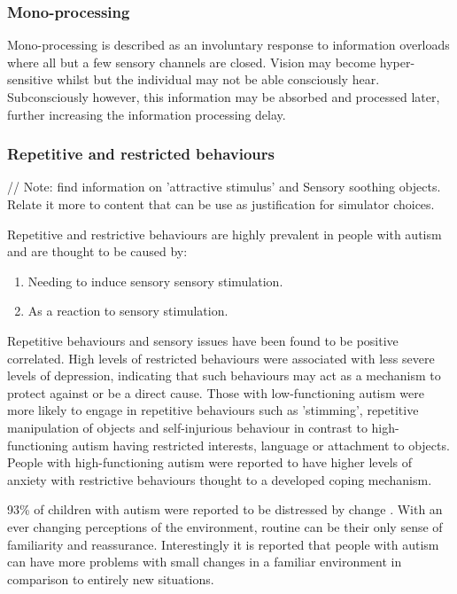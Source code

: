\documentclass[11pt]{report}
\begin{document}
\subsubsection{Mono-processing}
Mono-processing is described as an involuntary response to information overloads where all but a few sensory channels are closed. Vision may become hyper-sensitive whilst but the individual may not be able consciously hear. Subconsciously however, this information may be absorbed and processed later, further increasing the information processing delay. 


\subsubsection{Repetitive and restricted behaviours}

// Note: find information on 'attractive stimulus' and Sensory soothing objects. Relate it more to content that can be use as justification for simulator choices.

Repetitive and restrictive behaviours are highly prevalent in people with autism and are thought to be caused by:
\begin{enumerate}
\item Needing to induce sensory sensory stimulation\cite{rrsyouth}.
\item As a reaction to sensory stimulation\cite{rrsyouth}.
\end{enumerate}

Repetitive behaviours and sensory issues have been found to be positive correlated\cite{rrs_sensory}\cite{rrsyouth}. High levels of restricted behaviours were associated with less severe levels of depression, indicating that such behaviours may act as a mechanism to protect against or be a direct cause\cite{rrs_sensory}. Those with low-functioning autism were more likely to engage in repetitive behaviours such as 'stimming', repetitive manipulation of objects and self-injurious behaviour in contrast to high-functioning autism having restricted interests, language or attachment to objects\cite{rrs_sensory}. People with high-functioning autism were reported to have higher levels of anxiety with restrictive behaviours thought to a developed coping mechanism\cite{rrsyouth}.

93\% of children with autism were reported to be distressed by change \cite{fears}. With an ever changing perceptions of the environment, routine can be their only sense of familiarity and reassurance. Interestingly it is reported that people with autism can have more problems with small changes in a familiar environment in comparison to entirely new situations\cite{bayes}.  
\end{document}

